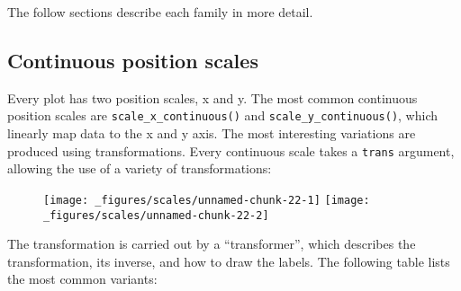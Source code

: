 The follow sections describe each family in more detail.

\subsection{Continuous position scales}\label{sub:scale-position}

Every plot has two position scales, x and y. 
 The most common continuous position scales
are \texttt{scale\_x\_continuous()} and \texttt{scale\_y\_continuous()},
which linearly map data to the x and y axis. 
  The most
interesting variations are produced using transformations. Every
continuous scale takes a \texttt{trans} argument, allowing the use of a
variety of transformations:

\begin{Shaded}
\begin{Highlighting}[]
\StringTok{ }
\StringTok{  }\NormalTok{() +}\StringTok{ }
\StringTok{  }\NormalTok{(} \NormalTok{)}

\StringTok{ }
\StringTok{  }\NormalTok{() +}\StringTok{ }
\StringTok{  }\NormalTok{(} \NormalTok{) +}
\StringTok{  }\NormalTok{(} \NormalTok{)}
\end{Highlighting}
\end{Shaded}

\begin{figure}[H]
  \texttt{[image: \_figures/scales/unnamed-chunk-22-1]}%
  \texttt{[image: \_figures/scales/unnamed-chunk-22-2]}
\end{figure}

The transformation is carried out by a ``transformer'', which describes
the transformation, its inverse, and how to draw the labels. The
following table lists the most common variants:


